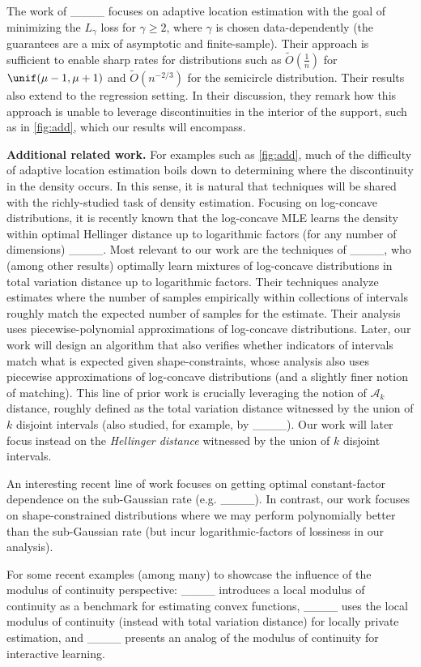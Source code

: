 The work of ____ focuses on adaptive location estimation with the goal of minimizing the $L_\gamma$ loss for $\gamma \ge 2$, where $\gamma$ is chosen data-dependently (the guarantees are a mix of asymptotic and finite-sample). Their approach is sufficient to enable sharp rates for distributions such as $\tilde{O}(\frac{1}{n})$ for $\unif(\mu-1,\mu+1)$ and $\tilde{O}(n^{-2/3})$ for the semicircle distribution. Their results also extend to the regression setting. In their discussion, they remark how this approach is unable to leverage discontinuities in the interior of the support, such as in \cref{fig:add}, which our results will encompass.

\textbf{Additional related work. } For examples such as \cref{fig:add}, much of the difficulty of adaptive location estimation boils down to determining where the discontinuity in the density occurs. In this sense, it is natural that techniques will be shared with the richly-studied task of density estimation. Focusing on log-concave distributions, it is recently known that the log-concave MLE learns the density within optimal Hellinger distance up to logarithmic factors (for any number of dimensions) ____. Most relevant to our work are the techniques of ____, who (among other results) optimally learn mixtures of log-concave distributions in total variation distance up to logarithmic factors. Their techniques analyze estimates where the number of samples empirically within collections of intervals roughly match the expected number of samples for the estimate. Their analysis uses piecewise-polynomial approximations of log-concave distributions. Later, our work will design an algorithm that also verifies whether indicators of intervals match what is expected given shape-constraints, whose analysis also uses piecewise approximations of log-concave distributions (and a slightly finer notion of matching). This line of prior work is crucially leveraging the notion of $\mathcal{A}_k$ distance, roughly defined as the total variation distance witnessed by the union of $k$ disjoint intervals (also studied, for example, by ____). Our work will later focus instead on the \textit{Hellinger distance} witnessed by the union of $k$ disjoint intervals. 

An interesting recent line of work focuses on getting optimal constant-factor dependence on the sub-Gaussian rate (e.g. ____). In contrast, our work focuses on shape-constrained distributions where we may perform polynomially better than the sub-Gaussian rate (but incur logarithmic-factors of lossiness in our analysis).

For some recent examples (among many) to showcase the influence of the modulus of continuity perspective: ____ introduces a local modulus of continuity as a benchmark for estimating convex functions, ____ uses the local modulus of continuity (instead with total variation distance) for locally private estimation, and ____ presents an analog of the modulus of continuity for interactive learning.






